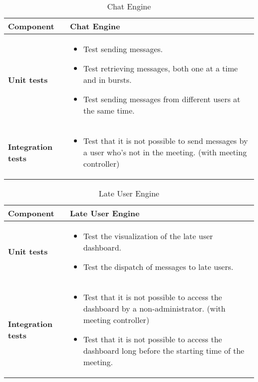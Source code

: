 \begin{table}[h]	
	\centering
	\def\arraystretch{1.5}
	\begin{tabular}{|m{4cm}|m{12cm}|}
		\hline
		\textbf{Component} & Chat Engine \\ \hline
		\textbf{Unit tests} & 
			\begin{itemize}
			\item Test sending messages.
			\item Test retrieving messages, both one at a time and in bursts.
			\item Test sending messages from different users at the same time.
			\end{itemize} \\ \hline
		\textbf{Integration tests} & 
			\begin{itemize}
			\item Test that it is not possible to send messages by a user who's not in the meeting. (with meeting controller)
			\end{itemize} \\ \hline
	\end{tabular}
	\caption{Chat Engine}
\end{table}

\begin{table}[h]	
	\centering
	\def\arraystretch{1.5}
	\begin{tabular}{|m{4cm}|m{12cm}|}
		\hline
		\textbf{Component} & Late User Engine \\ \hline
		\textbf{Unit tests} & 
			\begin{itemize}
			\item Test the visualization of the late user dashboard.
			\item Test the dispatch of messages to late users.
			\end{itemize} \\ \hline
		\textbf{Integration tests} & 
			\begin{itemize}
			\item Test that it is not possible to access the dashboard by a non-administrator. (with meeting controller)
			\item Test that it is not possible to access the dashboard long before the starting time of the meeting.
			\end{itemize} \\ \hline
	\end{tabular}
	\caption{Late User Engine}
\end{table}

